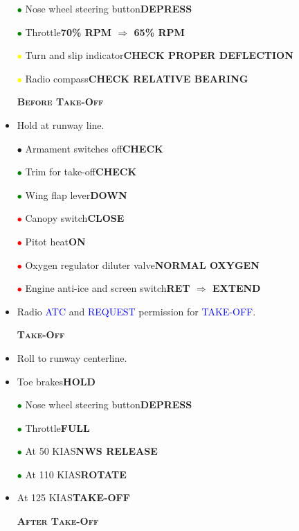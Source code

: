 \documentclass[a4paper,12pt,dvipsnames]{letter}
\newcommand{\radio}[1]{\textcolor{blue}{#1}}
\newcommand{\button}[1]{\textbf{#1}}
\newcommand{\myHead}[1]{{\LARGE\textsc{\textbf{#1}}}}
\newcommand{\bi}{\textcolor{ProcessBlue}{$\bullet$\;}}
\newcommand{\ri}{\textcolor{Red}{$\bullet$\;}}
\newcommand{\gi}{\textcolor{Green}{$\bullet$\;}}
\newcommand{\yi}{\textcolor{Yellow}{$\bullet$\;}}
\begin{document}
{\begin{itemize}
 \item[\gi] Nose wheel steering button\dotfill\button{DEPRESS}
 \item[\gi] Throttle\dotfill\button{70\% RPM $\Rightarrow$ 65\% RPM}
 \item[\yi] Turn and slip indicator\dotfill\button{CHECK PROPER DEFLECTION}
 \item[\yi] Radio compass\dotfill\button{CHECK RELATIVE BEARING}
\end{itemize}
\newpage
\begin{itemize}
 \item[] \myHead{Before Take-Off}
 \item Hold at runway line.
 \item[\bi] Armament switches off\dotfill\button{CHECK}
 \item[\gi] Trim for take-off\dotfill\button{CHECK}
 \item[\gi] Wing flap lever\dotfill\button{DOWN}
 \item[\ri] Canopy switch\dotfill\button{CLOSE}
 \item[\ri] Pitot heat\dotfill\button{ON}
 \item[\ri] Oxygen regulator diluter valve\dotfill\button{NORMAL OXYGEN}
 \item[\ri] Engine anti-ice and screen switch\dotfill\button{RET $\Rightarrow$ EXTEND}
 \item Radio \radio{ATC} and \radio{REQUEST} permission for \radio{TAKE-OFF}.
\end{itemize}
\begin{itemize}
 \item[] \myHead{Take-Off}
 \item Roll to runway centerline.
 \item Toe brakes\dotfill\button{HOLD}
 \item[\gi] Nose wheel steering button\dotfill\button{DEPRESS}
 \item[\gi] Throttle\dotfill\button{FULL}
 \item[\gi] At 50 KIAS\dotfill\button{NWS RELEASE}
 \item[\gi] At 110 KIAS\dotfill\button{ROTATE}
 \item At 125 KIAS\dotfill\button{TAKE-OFF}
 \end{itemize}
\begin{itemize}
 \item[] \myHead{After Take-Off}

\end{itemize}}
\end{document}

